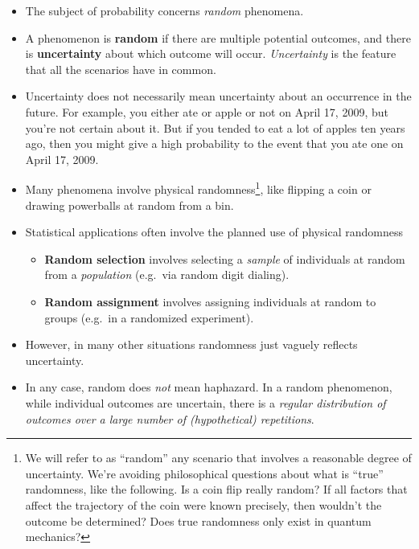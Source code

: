 \documentclass[
]{book}
\providecommand{\tightlist}{%
  \setlength{\itemsep}{0pt}\setlength{\parskip}{0pt}}
\theoremstyle{definition}
\theoremstyle{definition}
\theoremstyle{definition}
\theoremstyle{remark}
\begin{document}
\begin{itemize}
\tightlist
\item
  The subject of probability concerns \emph{random} phenomena.
\item
  A phenomenon is \textbf{random} if there are multiple potential outcomes, and there is \textbf{uncertainty} about which outcome will occur. \emph{Uncertainty} is the feature that all the scenarios have in common.
\item
  Uncertainty does not necessarily mean uncertainty about an occurrence in the future. For example, you either ate or apple or not on April 17, 2009, but you're not certain about it. But if you tended to eat a lot of apples ten years ago, then you might give a high probability to the event that you ate one on April 17, 2009.
\item
  Many phenomena involve physical randomness\footnote{We will refer to as ``random'' any scenario that involves a reasonable degree of uncertainty. We're avoiding philosophical questions about what is ``true'' randomness, like the following. Is a coin flip really random? If all factors that affect the trajectory of the coin were known precisely, then wouldn't the outcome be determined? Does true randomness only exist in quantum mechanics?}, like flipping a coin or drawing powerballs at random from a bin.
\item
  Statistical applications often involve the planned use of physical randomness

  \begin{itemize}
  \tightlist
  \item
    \textbf{Random selection} involves selecting a \emph{sample} of individuals at random from a \emph{population} (e.g.~via random digit dialing).
  \item
    \textbf{Random assignment} involves assigning individuals at random to groups (e.g.~in a randomized experiment).
  \end{itemize}
\item
  However, in many other situations randomness just vaguely reflects uncertainty.
\item
  In any case, random does \emph{not} mean haphazard. In a random phenomenon, while
  individual outcomes are uncertain, there is a \emph{regular distribution of
  outcomes over a large number of (hypothetical) repetitions}.


\end{itemize}
\end{document}
